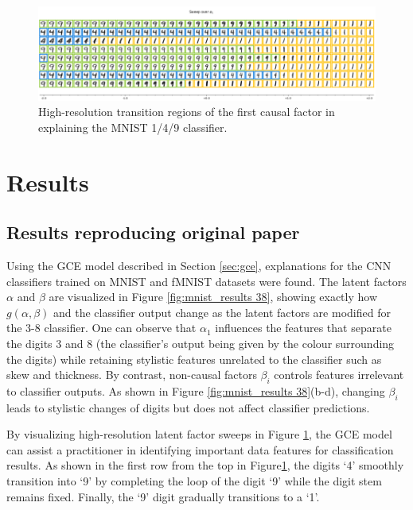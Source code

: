 
\begin{figure}[!htbp]
    \centering
    \includegraphics[width=\textwidth]{../openreview/pictures/mnist_149/alpha_1_149_high_reso.png}
    \caption{High-resolution transition regions of the first causal factor in explaining the MNIST 1/4/9 classifier.}
    \label{fig:high_resolution_149}
\end{figure}

\section{Results} \label{sec:results}
\subsection{Results reproducing original paper}

Using the GCE model described in Section \ref{sec:gce}, explanations for the CNN classifiers trained on MNIST and fMNIST datasets were found. The latent factors $\alpha$ and $\beta$ are visualized in Figure \ref{fig:mnist_results 38}, showing exactly how $g(\alpha, \beta)$ and the classifier output change as the latent factors are modified for the 3-8 classifier. One can observe that $\alpha_1$ influences the features that separate the digits 3 and 8 (the classifier's output being given by the colour surrounding the digits) while retaining stylistic features unrelated to the classifier such as skew and thickness. By contrast, non-causal factors ${\beta_i}$ controls features irrelevant to classifier outputs. As shown in Figure \ref{fig:mnist_results 38}(b-d), changing  ${\beta_i}$ leads to stylistic changes of digits but does not affect classifier predictions.

By visualizing high-resolution latent factor sweeps in Figure \ref{fig:high_resolution_149}, the GCE model can assist a practitioner in identifying important data features for classification results. As shown in the first row from the top in Figure\ref{fig:high_resolution_149}, the digits `4' smoothly transition into `9' by completing the loop of the digit `9’ while the digit stem remains fixed. Finally, the `9' digit gradually transitions to a `1'. 

